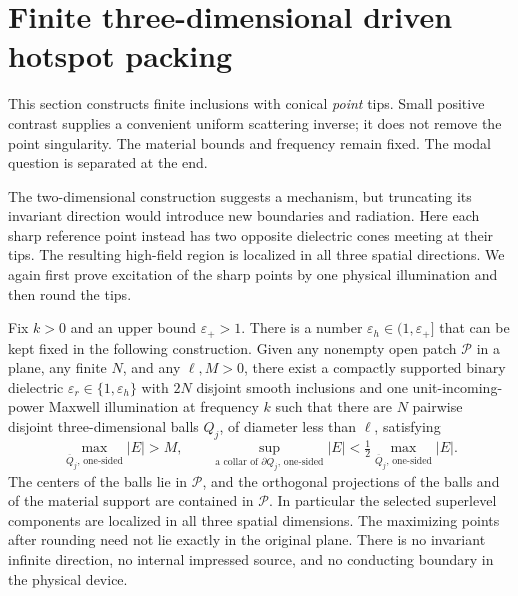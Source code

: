 \section{Finite three-dimensional driven hotspot packing}
\label{hs:three-section}

This section constructs finite inclusions with conical \emph{point} tips.
Small positive contrast supplies a convenient uniform scattering inverse;
it does not remove the point singularity.  The material bounds and frequency
remain fixed.  The modal question is separated at the end.

The two-dimensional construction suggests a mechanism, but truncating its
invariant direction would introduce new boundaries and radiation.  Here
each sharp reference point instead has two opposite dielectric cones
meeting at their tips.  The resulting high-field region is localized in
all three spatial directions.  We again first prove excitation of the
sharp points by one physical illumination and then round the tips.

\begin{theorem}
\label{hs:three-packing}
Fix $k>0$ and an upper bound $\varepsilon_+>1$.  There is a number
$\varepsilon_h\in(1,\varepsilon_+]$ that can be kept fixed in the
following construction.  Given any nonempty open patch $\mathcal P$ in
a plane, any finite $N$, and any $\ell,M>0$, there exist a compactly
supported binary dielectric $\varepsilon_r\in\{1,\varepsilon_h\}$
with $2N$ disjoint smooth inclusions and one unit-incoming-power
Maxwell illumination at frequency $k$ such that there are $N$
pairwise disjoint three-dimensional balls $Q_j$, of diameter less
than $\ell$, satisfying
\begin{equation}
 \max_{\overline Q_j,\,\text{one-sided}}|E|>M,
 \qquad
 \sup_{\text{a collar of }\partial Q_j,\,\text{one-sided}}|E|
 <\tfrac12\max_{\overline Q_j,\,\text{one-sided}}|E|.
 \label{hs:three-peak}
\end{equation}
The centers of the balls lie in $\mathcal P$, and the orthogonal
projections of the balls and of the material support are contained
in $\mathcal P$.  In particular the selected superlevel components
are localized in all three spatial dimensions.  The maximizing
points after rounding need not lie exactly in the original plane.
There is no invariant infinite direction, no internal impressed
source, and no conducting boundary in the physical device.
\end{theorem}

